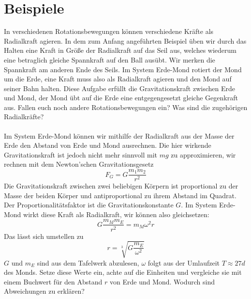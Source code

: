 \documentclass[11pt]{article}
\begin{document}
\section{Beispiele}
In verschiedenen Rotationsbewegungen können verschiedene Kräfte als Radialkraft agieren. In dem zum Anfang angeführten Beispiel üben wir durch das Halten eine Kraft in Größe der Radialkraft auf das Seil aus, welches wiederum eine betraglich gleiche Spannkraft auf den Ball ausübt. Wir merken die Spannkraft am anderen Ende des Seils. Im System Erde-Mond rotiert der Mond um die Erde, eine Kraft muss also als Radialkraft agieren und den Mond auf seiner Bahn halten. Diese Aufgabe erfüllt die Gravitationskraft zwischen Erde und Mond, der Mond übt auf die Erde eine entgegengesetzt gleiche Gegenkraft aus. Fallen euch noch andere Rotationsbewegungen ein? Was sind die zugehörigen Radialkräfte? \\\\ 

Im System Erde-Mond können wir mithilfe der Radialkraft aus der Masse der Erde den Abstand von Erde und Mond ausrechnen. Die hier wirkende Gravitationskraft ist jedoch nicht mehr sinnvoll mit $mg$ zu approximieren, wir rechnen mit dem Newton'schen Gravitationsgesetz
\begin{equation*}
    F_G = G \frac{m_1m_2}{r^2}
\end{equation*}
Die Gravitationskraft zwischen zwei beliebigen Körpern ist proportional zu der Masse der beiden Körper und antiproportional zu ihrem Abstand im Quadrat. Der Proportionalitätsfaktor ist die Gravitationskonstante $G$. Im System Erde-Mond wirkt diese Kraft als Radialkraft, wir können also gleichsetzen: 
\begin{equation*}
    G \frac{m_Mm_E}{r^2} = m_M\omega^2r 
\end{equation*}
Das lässt sich umstellen zu 
\begin{equation*}
    r  = \sqrt[3]{G\frac{m_E}{\omega^2}}
\end{equation*}
$G$ und $m_E$ sind aus dem Tafelwerk abzulesen, $\omega$ folgt aus der Umlaufzeit $T \approx 27d$ des Monds. Setze diese Werte ein, achte auf die Einheiten und vergleiche sie mit einem Buchwert für den Abstand $r$ von Erde und Mond. Wodurch sind Abweichungen zu erklären? 
\end{document}
